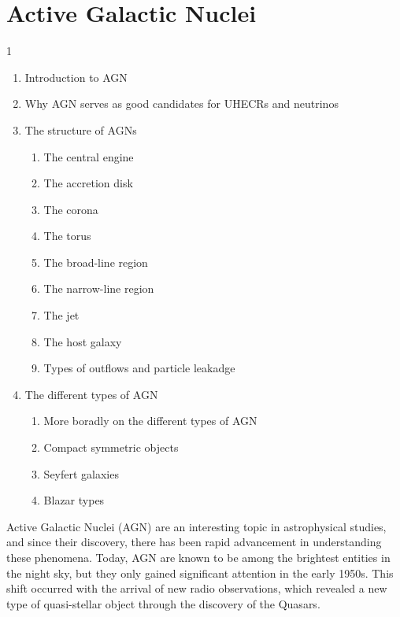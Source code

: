 \section{Active Galactic Nuclei}1
\begin{enumerate}
    \item Introduction to AGN
    \item Why AGN serves as good candidates for UHECRs and neutrinos
    \item The structure of AGNs 
    \begin{enumerate}
        \item The central engine
        \item The accretion disk
        \item The corona
        \item The torus
        \item The broad-line region
        \item The narrow-line region
        \item The jet
        \item The host galaxy
        \item Types of outflows and particle leakadge
    \end{enumerate}
    \item The different types of AGN
    \begin{enumerate}
        \item More boradly on the different types of AGN
        \item Compact symmetric objects
        \item Seyfert galaxies
        \item Blazar types
    \end{enumerate}
\end{enumerate}







Active Galactic Nuclei (AGN) are an interesting topic in astrophysical studies, and 
since their discovery, there has been rapid advancement in understanding these phenomena.
Today, AGN are known to be among the brightest entities in the night sky,
but they only gained significant attention in the early 1950s. 
This shift occurred with the arrival of new radio observations, which revealed a new type of quasi-stellar
object through the discovery of the Quasars.

